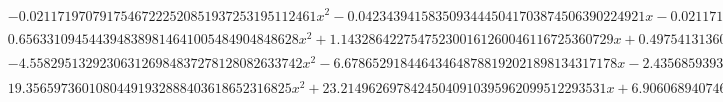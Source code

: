 \documentclass{article}
\begin{document}
\begin{landscape}
\begin{eqnarray*}
\begin{array}{cc}
\begin{array}{cc}
 -0.02117197079175467222520851937253195112461 x^2-0.04234394158350934445041703874506390224921 x-0.02117197079175467222520851937253195112461 & x\geq -1\land x<-\frac{7}{8} \\
 0.6563310945443948389814641005484904848628 x^2+1.143286422754752300161260046116725360729 x+0.4975413136062347972924002052545008514283 & x\geq -\frac{7}{8}\land x<-\frac{3}{4} \\
 -4.558295132923063126984837278128082633742 x^2-6.678652918446434648788192021898134317178 x-2.435685939344210308563644320251071527787 & x\geq -\frac{3}{4}\land x<-\frac{5}{8} \\
 19.35659736010804491932888403618652316825 x^2+23.21496269784245040910395962099512293531 x+6.906068940746066272027653068153071363617 & x\geq -\frac{5}{8}\land x<-\frac{1}{2}
\end{array}


\end{array}
\end{eqnarray*}
\end{landscape}
\end{document}

